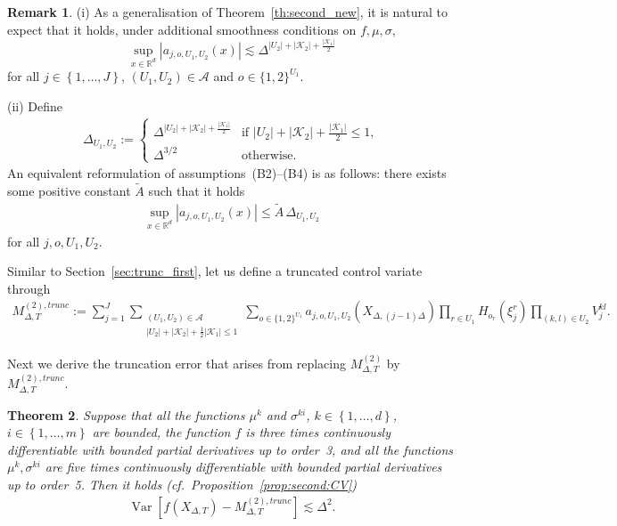 \documentclass[11pt,a4paper]{amsart}
\theoremstyle{plain}
\newtheorem{theorem}{Theorem}[section]
\theoremstyle{definition}
\newtheorem{remark}[theorem]{Remark}
\theoremstyle{remark}
\numberwithin{equation}{section}
\newcommand*{\Var}{\operatorname{Var}}
\newcommand*{\RR}{\mathbb R}
\newcommand*{\cA}{\mathcal A}
\renewcommand*{\doteq}{:=}
\begin{document}
\begin{remark}
(i) As a generalisation of Theorem~\ref{th:second_new}, it is natural to expect that it holds, under additional smoothness conditions on $f,\mu,\sigma$,
$$
\sup_{x\in\RR^d}\left|a_{j,o,U_1,U_2}(x)\right|\lesssim \Delta^{\left|U_2\right|+\left|\mathcal{K}_2\right|+\frac{\left|\mathcal{K}_1\right|}{2}}
$$
for all $j\in\left\{1,\ldots,J\right\}$, $(U_1,U_2)\in\cA$ and $o\in\{1,2\}^{U_1}$.

(ii) Define 
\begin{align}
\label{delta_u}
\Delta_{U_1,U_2}:=\left\{\begin{array}{ll} \Delta^{\left|U_2\right|+\left|\mathcal{K}_2\right|+\frac{\left|\mathcal{K}_1\right|}{2}} & \text{if }\left|U_2\right|+\left|\mathcal{K}_2\right|+\frac{\left|\mathcal{K}_1\right|}{2}\le 1, \\
\Delta^{3/2} & \text{otherwise}.\end{array}\right.
\end{align}
An equivalent reformulation of assumptions~(B2)--(B4) is as follows: there exists some positive constant $\tilde A$ such that it holds
\begin{align}
\label{tilde_A}
\sup_{x\in\RR^d}\left|a_{j,o,U_1,U_2}(x)\right|\le \tilde A\,\Delta_{U_1,U_2}
\end{align}
for all $j,o,U_1,U_2$.
\end{remark}
Similar to Section~\ref{sec:trunc_first}, let us define a truncated control variate through
\begin{align}
\label{cv:second_trunc}
M_{\Delta,T}^{(2),trunc}\doteq \sum_{j=1}^J
\sum_{\substack{(U_1,U_2)\in\cA\\ \left|U_2\right|+\left|\mathcal{K}_2\right|+\frac{1}{2}\left|\mathcal{K}_1\right|\le 1}}
\sum_{o\in\{1,2\}^{U_1}}
a_{j,o,U_1,U_2}(X_{\Delta,(j-1)\Delta})
\prod_{r\in U_1} H_{o_r}(\xi_j^r)
\prod_{(k,l)\in U_2} V_j^{kl}.
\end{align}

Next we derive the truncation error that arises from replacing $M_{\Delta,T}^{(2)}$ by $M_{\Delta,T}^{(2),trunc}$.

\begin{theorem}
\label{th:second_var}
Suppose that all the functions $\mu^k$ and $\sigma^{ki}$, $k\in\left\{1,\ldots,d\right\}$, $i\in\left\{1,\ldots,m\right\}$ are bounded,
the function $f$ is three times continuously differentiable
with bounded partial derivatives up to order~3,
and all the functions $\mu^k,\sigma^{ki}$ are five times continuously differentiable with bounded partial derivatives up to order~5. Then it holds (cf.\ Proposition~\ref{prop:second:CV})
\begin{align}
\label{second:cv_var}
\Var\left[f(X_{\Delta,T})-M_{\Delta,T}^{(2),trunc}\right]\lesssim\Delta^2.
\end{align}
\end{theorem}
\end{document}
